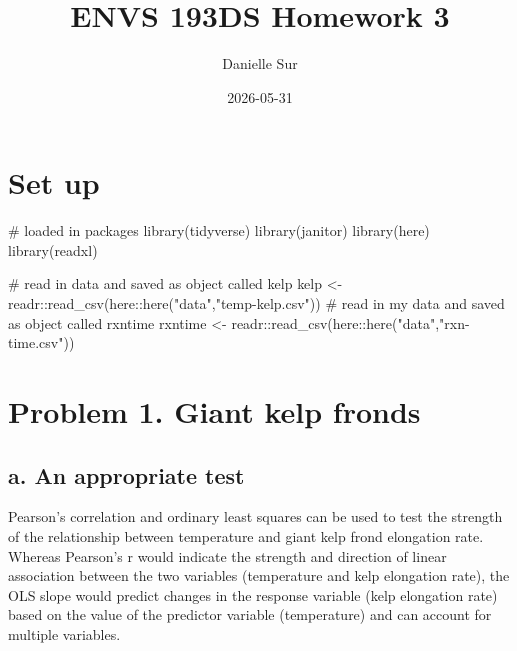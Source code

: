 \documentclass[
  letterpaper,
  DIV=11,
  numbers=noendperiod]{scrartcl}
\title{ENVS 193DS Homework 3}
\author{Danielle Sur}
\date{2026-05-31}
\newenvironment{Shaded}{\begin{snugshade}}{\end{snugshade}}
\newcommand{\CommentTok}[1]{\textcolor[rgb]{0.37,0.37,0.37}{#1}}
\newcommand{\FunctionTok}[1]{\textcolor[rgb]{0.28,0.35,0.67}{#1}}
\newcommand{\NormalTok}[1]{\textcolor[rgb]{0.00,0.23,0.31}{#1}}
\newcommand{\OtherTok}[1]{\textcolor[rgb]{0.00,0.23,0.31}{#1}}
\newcommand{\SpecialCharTok}[1]{\textcolor[rgb]{0.37,0.37,0.37}{#1}}
\newcommand{\StringTok}[1]{\textcolor[rgb]{0.13,0.47,0.30}{#1}}
\renewcommand*\contentsname{Table of contents}
\newcommand\contentsname{Table of contents}
\begin{document}
\maketitle

\renewcommand*\contentsname{Table of contents}
{
\setcounter{tocdepth}{3}
\tableofcontents
}

\section{Set up}\label{set-up}

\begin{Shaded}
\begin{Highlighting}[]
\CommentTok{\# loaded in packages}
\FunctionTok{library}\NormalTok{(tidyverse)}
\FunctionTok{library}\NormalTok{(janitor)}
\FunctionTok{library}\NormalTok{(here)}
\FunctionTok{library}\NormalTok{(readxl)}

\CommentTok{\# read in data and saved as object called \textasciigrave{}kelp\textasciigrave{}}
\NormalTok{kelp   }\OtherTok{\textless{}{-}}\NormalTok{ readr}\SpecialCharTok{::}\FunctionTok{read\_csv}\NormalTok{(here}\SpecialCharTok{::}\FunctionTok{here}\NormalTok{(}\StringTok{"data"}\NormalTok{,}\StringTok{"temp{-}kelp.csv"}\NormalTok{))}
\CommentTok{\# read in my data and saved as object called \textquotesingle{}rxntime\textquotesingle{}}
\NormalTok{rxntime }\OtherTok{\textless{}{-}}\NormalTok{ readr}\SpecialCharTok{::}\FunctionTok{read\_csv}\NormalTok{(here}\SpecialCharTok{::}\FunctionTok{here}\NormalTok{(}\StringTok{"data"}\NormalTok{,}\StringTok{"rxn{-}time.csv"}\NormalTok{))}
\end{Highlighting}
\end{Shaded}

\section{Problem 1. Giant kelp
fronds}\label{problem-1.-giant-kelp-fronds}

\subsection{a. An appropriate test}\label{a.-an-appropriate-test}

Pearson's correlation and ordinary least squares can be used to test the
strength of the relationship between temperature and giant kelp frond
elongation rate. Whereas Pearson's r would indicate the strength and
direction of linear association between the two variables (temperature
and kelp elongation rate), the OLS slope would predict changes in the
response variable (kelp elongation rate) based on the value of the
predictor variable (temperature) and can account for multiple variables.
\end{document}
